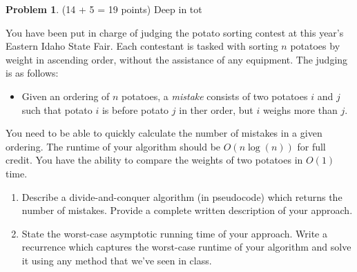 \documentclass[11pt]{article}
\theoremstyle{definition}
\theoremstyle{theorem}
\newtheorem{prob}{Problem}
\newcommand{\solution}[1]{\medskip\noindent{\color{DarkBlue}\textbf{Solution:}} #1}
\newcommand{\solution}[1]{}
\begin{document}
\newpage

\begin{prob}
  \label{prob:potatoes}
(14 + 5 = 19 points) Deep in tot
\end{prob}


\noindent You have been put in charge of judging the potato sorting contest at this year's Eastern Idaho State Fair. Each contestant is tasked with sorting $n$ potatoes by weight in ascending order, without the assistance of any equipment. The judging is as follows:

\begin{itemize}
\item Given an ordering of $n$ potatoes, a \emph{mistake} consists of two potatoes $i$ and $j$ such that potato $i$ is before potato $j$ in ther order, but $i$ weighs more than $j$.
\end{itemize}

You need to be able to quickly calculate the number of mistakes in a given ordering. The runtime of your algorithm should be $O(n \log(n))$ for full credit. You have the ability to compare the weights of two potatoes in $O(1)$ time.



\begin{enumerate}[label=(\alph*)]
\item Describe a divide-and-conquer algorithm (in pseudocode) which returns the number of mistakes. Provide a complete written description of your approach.

\solution



\item State the worst-case asymptotic running time of your approach.  Write a recurrence which captures the worst-case runtime of your algorithm and solve it using any method that we've seen in class.

\solution 


\end{enumerate}
\end{document}
